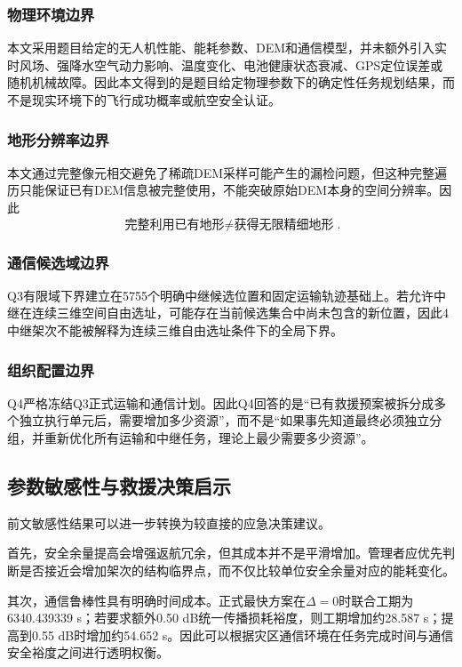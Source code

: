 \documentclass[UTF8,a4paper,12pt]{ctexart}
\begin{document}
\subsubsection{物理环境边界}

本文采用题目给定的无人机性能、能耗参数、DEM和通信模型，并未额外引入实时风场、强降水空气动力影响、温度变化、电池健康状态衰减、GPS定位误差或随机机械故障。因此本文得到的是题目给定物理参数下的确定性任务规划结果，而不是现实环境下的飞行成功概率或航空安全认证。

\subsubsection{地形分辨率边界}

本文通过完整像元相交避免了稀疏DEM采样可能产生的漏检问题，但这种完整遍历只能保证已有DEM信息被完整使用，不能突破原始DEM本身的空间分辨率。因此
\[
\boxed{
\text{完整利用已有地形}
\neq
\text{获得无限精细地形}
}.
\]

\subsubsection{通信候选域边界}

Q3有限域下界建立在5755个明确中继候选位置和固定运输轨迹基础上。若允许中继在连续三维空间自由选址，可能存在当前候选集合中尚未包含的新位置，因此4中继架次不能被解释为连续三维自由选址条件下的全局下界。

\subsubsection{组织配置边界}

Q4严格冻结Q3正式运输和通信计划。因此Q4回答的是“已有救援预案被拆分成多个独立执行单元后，需要增加多少资源”，而不是“如果事先知道最终必须独立分组，并重新优化所有运输和中继任务，理论上最少需要多少资源”。

\subsection{参数敏感性与救援决策启示}

前文敏感性结果可以进一步转换为较直接的应急决策建议。

首先，安全余量提高会增强返航冗余，但其成本并不是平滑增加。管理者应优先判断是否接近会增加架次的结构临界点，而不仅比较单位安全余量对应的能耗变化。

其次，通信鲁棒性具有明确时间成本。正式最快方案在$\Delta=0$时联合工期为6340.439339 s；若要求额外0.50 dB统一传播损耗裕度，则工期增加约28.587 s；提高到0.55 dB时增加约54.652 s。因此可以根据灾区通信环境在任务完成时间与通信安全裕度之间进行透明权衡。
\end{document}
